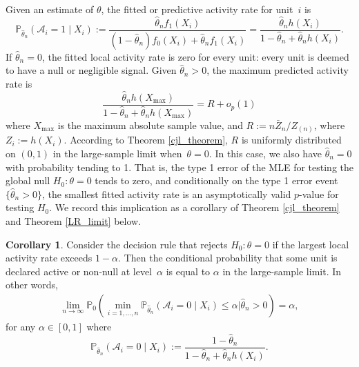 \documentclass[11pt]{article}
\theoremstyle{definition}
\newtheorem{corollary}{Corollary}[section]
\def\Prob{{\mathbb P}}
\begin{document}
Given an estimate of $\theta$, the fitted or predictive activity rate for unit~$i$ is
\begin{equation}\label{eqActivityRatio}
\mathbb{P}_{\hat{\theta}_n}(\mathcal{A}_i = 1 \mid X_i) := \frac {\hat\theta_n f_1(X_{i})} {(1-\hat\theta_n)f_0(X_{i}) + \hat\theta_n f_1(X_{i})} = 
\frac {\hat\theta_n h(X_{i})} {1 - \hat\theta_n + \hat\theta_n h(X_{i})}.
\end{equation}
%
If $\hat\theta_n = 0$, the fitted local activity rate is zero for every unit: every unit is deemed to have a null or negligible signal. Given $\hat\theta_n > 0$, the maximum predicted activity rate is
\[
\frac {\hat\theta_n h(X_{\max})} {1 - \hat\theta_n + \hat\theta_n h(X_{\max})} = R + o_p(1)
\]
where $X_{\max}$ is the maximum absolute sample value, and $R := n\bar{Z}_n/Z_{(n)}$, where $Z_i := h(X_i)$. According to Theorem \ref{cjl_theorem}, $R$ is uniformly distributed on $(0, 1)$ in the large-sample limit when~$\theta = 0$.
In this case, we also have $\hat\theta_n = 0$ with probability tending to 1. That is, the type 1 error of the MLE for testing the global null $H_0: \theta=0$ tends to zero, and conditionally on the type 1 error event $\{\hat\theta_n >0\}$, the smallest fitted activity rate is an asymptotically valid $p$-value for testing $H_0$. We record this implication as a corollary of Theorem \ref{cjl_theorem} and Theorem \ref{LR_limit} below.


\begin{corollary}
	Consider the decision rule that rejects $H_0:\theta=0$ if the largest local activity rate exceeds $1-\alpha$. Then the conditional probability that some unit is declared active or non-null at level~$\alpha$ is equal to $\alpha$ in the large-sample limit. In other words, 
	\begin{align*}
	\lim_{n\to\infty}\Prob_0\left(\min_{i=1,\dots,n} \mathbb{P}_{\hat{\theta}_n}(\mathcal{A}_i=0\mid X_i)
	\leq \alpha \mathrel{\Big |} \hat{\theta}_n>0\right) = \alpha,
	\end{align*}
	for any $\alpha \in [0,1]$ where 
	\[
	\mathbb{P}_{\hat{\theta}_n}(\mathcal{A}_i=0\mid X_i) := \frac{1-\hat{\theta}_n}{1-\hat{\theta}_n + \hat{\theta}_n h(X_i)}.
	\]
\end{corollary}
\end{document}
